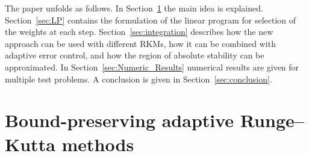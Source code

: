 \documentclass[a4paper]{article}
\numberwithin{equation}{section}
\theoremstyle{plain}
\theoremstyle{definition}
\numberwithin{theorem}{section}
\newcommand{\1}{\mathbbm{1}}
\begin{document}
The paper unfolds as follows. In Section~\ref{sec:main_idea} the main idea is
explained. Section~\ref{sec:LP} contains the formulation of the linear program
for selection of the weights at each step.
Section~\ref{sec:integration} describes how the new approach can be used with
different RKMs, how it can be combined with adaptive error control, and how the
region of absolute stability can be approximated.
In Section~\ref{sec:Numeric_Results} numerical results are given for multiple test problems.
A conclusion is given in Section~\ref{sec:conclusion}.


\section{Bound-preserving adaptive Runge--Kutta methods}\label{sec:main_idea}
\end{document}
